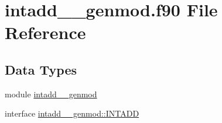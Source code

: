 \hypertarget{intadd____genmod_8f90}{\section{intadd\+\_\+\+\_\+genmod.\+f90 File Reference}
\label{intadd____genmod_8f90}
}
\subsection*{Data Types}
\begin{DoxyCompactItemize}
\item 
module \hyperlink{classintadd____genmod}{intadd\+\_\+\+\_\+genmod}
\item 
interface \hyperlink{interfaceintadd____genmod_1_1INTADD}{intadd\+\_\+\+\_\+genmod\+::\+I\+N\+T\+A\+D\+D}
\end{DoxyCompactItemize}
